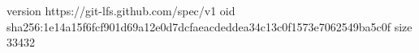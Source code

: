 version https://git-lfs.github.com/spec/v1
oid sha256:1e14a15f6fcf901d69a12e0d7dcfaeacdeddea34c13c0f1573e7062549ba5c0f
size 33432
